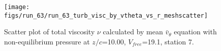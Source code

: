 \begin{figure}[H]
\centering
\texttt{[image: figs/run\_63/run\_63\_turb\_visc\_by\_vtheta\_vs\_r\_meshscatter]}
\caption{Scatter plot of total viscosity $\nu$ calculated by mean $\bar{v}_{\theta}$ equation with non-equilibrium pressure at $z/c$=10.00, $V_{free}$=19.1, station 7.}
\label{fig:run_63_turb_visc_by_vtheta_vs_r_meshscatter}
\end{figure}


